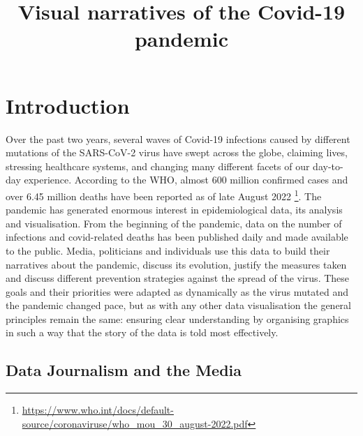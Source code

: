 \documentclass[article]{jdssv}\usepackage[]{graphicx}\usepackage[]{xcolor}
\author{
   \And }
\title{Visual narratives of the Covid-19 pandemic}
\begin{document}







\section{Introduction}

Over the past two years, several waves of Covid-19 infections caused by different mutations of the SARS-CoV-2 virus have swept across the globe, claiming lives, stressing healthcare systems, and changing many different facets of our day-to-day experience. According to the WHO, almost 600 million confirmed cases and over 6.45 million deaths have been reported as of late August 2022 \footnote{\url{https://www.who.int/docs/default-source/coronaviruse/who_mou_30_august-2022.pdf}}. The pandemic has generated enormous interest in epidemiological data, its analysis and visualisation. From the beginning of the pandemic, data on the number of infections and covid-related deaths has been published daily and made available to the public. Media, politicians and individuals use this data to build their narratives about the pandemic, discuss its evolution, justify the measures taken and discuss different prevention strategies against the spread of the virus. %
These goals and their priorities were adapted as dynamically as the virus mutated and the pandemic changed pace, but as with any other data visualisation the general principles remain the same: ensuring clear understanding by organising graphics in such a way that the story of the data is told most effectively.

\subsection{Data Journalism and the Media}
\end{document}
